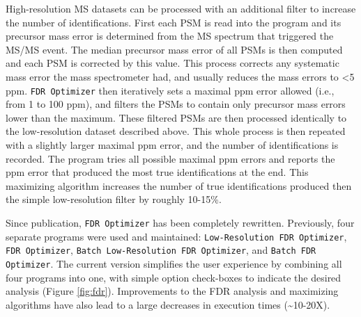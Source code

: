 High-resolution MS datasets can be processed with an additional filter to increase the number of identifications. First each PSM is read into the program and its precursor mass error is determined from the MS spectrum that triggered the MS/MS event. The median precursor mass error of all PSMs is then computed and each PSM is corrected by this value. This process corrects any systematic mass error the mass spectrometer had, and usually reduces the mass errors to <5 ppm. \texttt{FDR Optimizer} then iteratively sets a maximal ppm error allowed (i.e., from 1 to 100 ppm), and filters the PSMs to contain only precursor mass errors lower than the maximum. These filtered PSMs are then processed identically to the low-resolution dataset described above. This whole process is then repeated with a slightly larger maximal ppm error, and the number of identifications is recorded. The program tries all possible maximal ppm errors and reports the ppm error that produced the most true identifications at the end. This maximizing algorithm increases the number of true identifications produced then the simple low-resolution filter by roughly 10-15\%.

Since publication, \texttt{FDR Optimizer} has been completely rewritten. Previously, four separate programs were used and maintained: \texttt{Low-Resolution FDR Optimizer}, \texttt{FDR Optimizer}, \texttt{Batch Low-Resolution FDR Optimizer}, and \texttt{Batch FDR Optimizer}. The current version simplifies the user experience by combining all four programs into one, with simple option check-boxes to indicate the desired analysis (Figure \ref{fig:fdr}). Improvements to the FDR analysis and maximizing algorithms have also lead to a large decreases in execution times (\textasciitilde10-20X).

